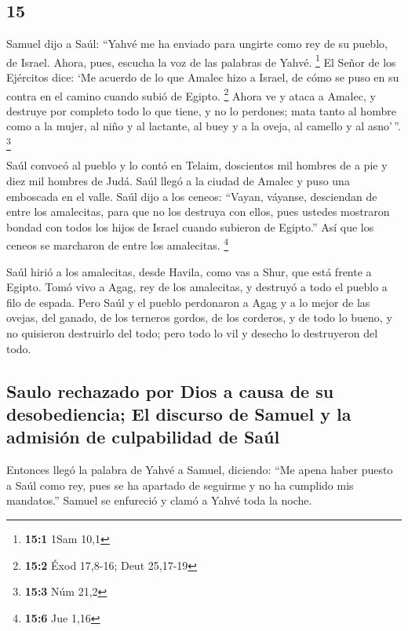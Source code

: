 \begin{paracol}{2}
\hypertarget{section-28}{%
\section{15}\label{section-28}}

 Samuel dijo a Saúl: ``Yahvé me ha enviado para ungirte
como rey de su pueblo, de Israel. Ahora, pues, escucha la voz de las
palabras de Yahvé. \footnote{\textbf{15:1} 1Sam 10,1}  El
Señor de los Ejércitos dice: `Me acuerdo de lo que Amalec hizo a Israel,
de cómo se puso en su contra en el camino cuando subió de Egipto.
\footnote{\textbf{15:2} Éxod 17,8-16; Deut 25,17-19} 
Ahora ve y ataca a Amalec, y destruye por completo todo lo que tiene, y
no lo perdones; mata tanto al hombre como a la mujer, al niño y al
lactante, al buey y a la oveja, al camello y al asno'\,''. \footnote{\textbf{15:3}
  Núm 21,2}

 Saúl convocó al pueblo y lo contó en Telaim, doscientos
mil hombres de a pie y diez mil hombres de Judá.  Saúl
llegó a la ciudad de Amalec y puso una emboscada en el valle.
 Saúl dijo a los ceneos: ``Vayan, váyanse, desciendan de
entre los amalecitas, para que no los destruya con ellos, pues ustedes
mostraron bondad con todos los hijos de Israel cuando subieron de
Egipto.'' Así que los ceneos se marcharon de entre los amalecitas.
\footnote{\textbf{15:6} Jue 1,16}

 Saúl hirió a los amalecitas, desde Havila, como vas a
Shur, que está frente a Egipto.  Tomó vivo a Agag, rey de
los amalecitas, y destruyó a todo el pueblo a filo de espada.
 Pero Saúl y el pueblo perdonaron a Agag y a lo mejor de
las ovejas, del ganado, de los terneros gordos, de los corderos, y de
todo lo bueno, y no quisieron destruirlo del todo; pero todo lo vil y
desecho lo destruyeron del todo.

\hypertarget{saulo-rechazado-por-dios-a-causa-de-su-desobediencia-el-discurso-de-samuel-y-la-admisiuxf3n-de-culpabilidad-de-sauxfal}{%
\subsection{Saulo rechazado por Dios a causa de su desobediencia; El
discurso de Samuel y la admisión de culpabilidad de
Saúl}\label{saulo-rechazado-por-dios-a-causa-de-su-desobediencia-el-discurso-de-samuel-y-la-admisiuxf3n-de-culpabilidad-de-sauxfal}}

 Entonces llegó la palabra de Yahvé a Samuel, diciendo:
 ``Me apena haber puesto a Saúl como rey, pues se ha
apartado de seguirme y no ha cumplido mis mandatos.'' Samuel se
enfureció y clamó a Yahvé toda la noche.


\end{paracol}
